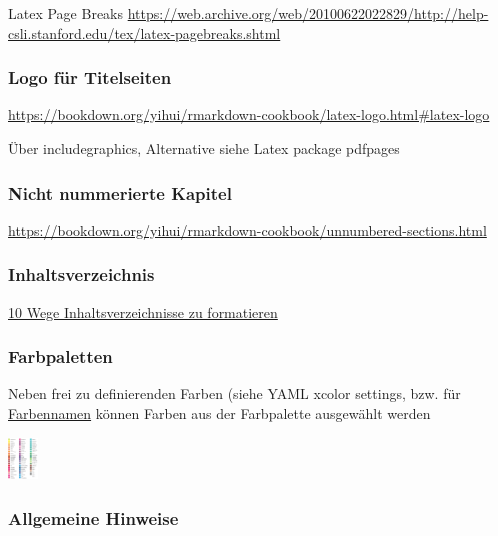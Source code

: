 \documentclass[
  a4paper,
  twoside]{article}
\begin{document}
Latex Page Breaks \url{https://web.archive.org/web/20100622022829/http://help-csli.stanford.edu/tex/latex-pagebreaks.shtml}

\hypertarget{logo-fuxfcr-titelseiten}{%
\subsubsection{Logo für Titelseiten}\label{logo-fuxfcr-titelseiten}}

\url{https://bookdown.org/yihui/rmarkdown-cookbook/latex-logo.html\#latex-logo}

Über includegraphics, Alternative siehe Latex package pdfpages

\hypertarget{nicht-nummerierte-kapitel}{%
\subsubsection{Nicht nummerierte Kapitel}\label{nicht-nummerierte-kapitel}}

\url{https://bookdown.org/yihui/rmarkdown-cookbook/unnumbered-sections.html}

\hypertarget{inhaltsverzeichnis}{%
\subsubsection{Inhaltsverzeichnis}\label{inhaltsverzeichnis}}

\href{https://texblog.org/2011/09/09/10-ways-to-customize-tocloflot/}{10 Wege Inhaltsverzeichnisse zu formatieren}

\hypertarget{farbpaletten}{%
\subsubsection{Farbpaletten}\label{farbpaletten}}

Neben frei zu definierenden Farben (siehe YAML xcolor settings, bzw. für \href{https://www.latextemplates.com/svgnames-colors}{Farbennamen} können Farben aus der Farbpalette ausgewählt werden

\includegraphics[width=30px]{latexcolor.png}

\hypertarget{allgemeine-hinweise}{%
\subsubsection{Allgemeine Hinweise}\label{allgemeine-hinweise}}
\end{document}
